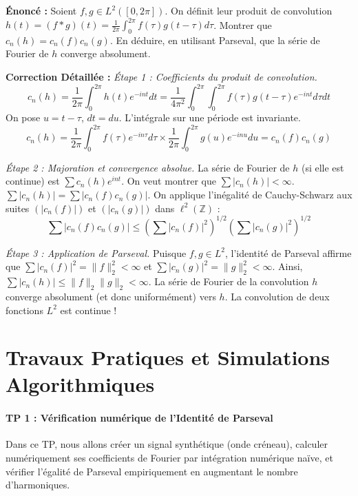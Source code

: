 \documentclass[11pt,a4paper]{article}
\begin{document}
\textbf{Énoncé :} Soient $f, g \in L^2([0, 2\pi])$. On définit leur produit de convolution $h(t) = (f * g)(t) = \frac{1}{2\pi} \int_0^{2\pi} f(\tau) g(t - \tau) d\tau$.
Montrer que $c_n(h) = c_n(f) c_n(g)$. En déduire, en utilisant Parseval, que la série de Fourier de $h$ converge absolument.

\textbf{Correction Détaillée :}
\textit{Étape 1 : Coefficients du produit de convolution.}
$$c_n(h) = \frac{1}{2\pi} \int_0^{2\pi} h(t) e^{-int} dt = \frac{1}{4\pi^2} \int_0^{2\pi} \int_0^{2\pi} f(\tau) g(t - \tau) e^{-int} d\tau dt$$
On pose $u = t - \tau$, $dt = du$. L'intégrale sur une période est invariante.
$$c_n(h) = \frac{1}{2\pi} \int_0^{2\pi} f(\tau) e^{-in\tau} d\tau \times \frac{1}{2\pi} \int_0^{2\pi} g(u) e^{-inu} du = c_n(f) c_n(g)$$

\textit{Étape 2 : Majoration et convergence absolue.}
La série de Fourier de $h$ (si elle est continue) est $\sum c_n(h) e^{int}$.
On veut montrer que $\sum |c_n(h)| < \infty$.
$\sum |c_n(h)| = \sum |c_n(f) c_n(g)|$.
On applique l'inégalité de Cauchy-Schwarz aux suites $(|c_n(f)|)$ et $(|c_n(g)|)$ dans $\ell^2(\mathbb{Z})$ :
$$\sum |c_n(f) c_n(g)| \le \left( \sum |c_n(f)|^2 \right)^{1/2} \left( \sum |c_n(g)|^2 \right)^{1/2}$$

\textit{Étape 3 : Application de Parseval.}
Puisque $f, g \in L^2$, l'identité de Parseval affirme que $\sum |c_n(f)|^2 = \|f\|_2^2 < \infty$ et $\sum |c_n(g)|^2 = \|g\|_2^2 < \infty$.
Ainsi, $\sum |c_n(h)| \le \|f\|_2 \|g\|_2 < \infty$.
La série de Fourier de la convolution $h$ converge absolument (et donc uniformément) vers $h$. La convolution de deux fonctions $L^2$ est continue !

\vspace{1cm}

\newpage
\part{Travaux Pratiques et Simulations Algorithmiques}
\subsection*{TP 1 : Vérification numérique de l'Identité de Parseval}


Dans ce TP, nous allons créer un signal synthétique (onde créneau), calculer numériquement ses coefficients de Fourier par intégration numérique naïve, et vérifier l'égalité de Parseval empiriquement en augmentant le nombre d'harmoniques.
\end{document}
